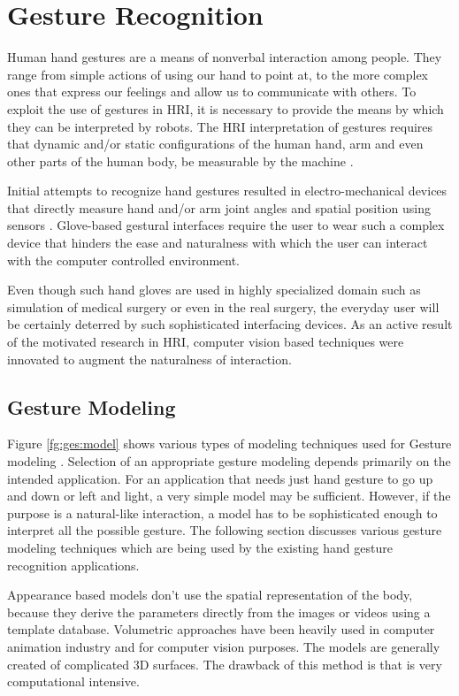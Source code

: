 \section{Gesture Recognition} Human hand gestures are a means of nonverbal interaction among people. They range from simple actions of using our hand to point at, to the more complex ones that express our feelings and allow us to communicate with others. To exploit the use of gestures in HRI, it is necessary to provide the means by which they can be interpreted by robots. The HRI interpretation of gestures requires that dynamic and/or static configurations of the human hand, arm and even other parts of the human body, be measurable by the machine \cite{4}. 

Initial attempts to recognize hand gestures resulted in electro-mechanical devices that directly measure hand and/or arm joint angles and spatial position using sensors \cite{4}. Glove-based gestural interfaces require the user to wear such a complex device that hinders the ease and naturalness with which the user can interact with the computer controlled environment. 

Even though such hand gloves are used in highly specialized domain such as simulation of medical surgery or even in the real surgery, the everyday user will be certainly deterred by such sophisticated interfacing devices. As an active result of the motivated research in HRI, computer vision based techniques were innovated to augment the naturalness of interaction.

\subsection{Gesture Modeling} Figure \ref{fg:ges:model} shows various types of modeling techniques used for Gesture modeling \cite{4}. Selection of an appropriate gesture modeling depends primarily on the intended application. For an application that needs just hand gesture to go up and down or left and light, a very simple model may be sufficient. However, if the purpose is a natural-like interaction, a model has to be sophisticated enough to interpret all the possible gesture. The following section discusses various gesture modeling techniques which are being used by the existing hand gesture recognition applications. 



Appearance based models don't use the spatial representation of the body, because they derive the parameters directly from the images or videos using a template database. Volumetric approaches have been heavily used in computer animation industry and for computer vision purposes. The models are generally created of complicated 3D surfaces. The drawback of this method is that is very computational intensive. 

